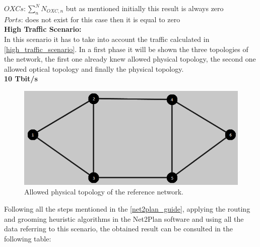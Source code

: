 \vspace{13pt}
$OXCs: \sum_n^N N_{OXC,n}$ but as mentioned initially this result is always zero \\

$Ports$: does not exist for this case then it is equal to zero \\

\textbf{High Traffic Scenario:}\\

In this scenario it has to take into account the traffic calculated in \ref{high_traffic_scenario}. In a first phase it will be shown the three topologies of the network, the first one already knew allowed physical topology, the second one allowed optical topology and finally the physical topology.\\

\textbf{10 Tbit/s}

\begin{figure}[H]
\centering
\includegraphics[width=13cm]{sdf/heuristic/figures/topological_design1}
\caption{Allowed physical topology of the reference network.}
\label{allowed_physical_surv_ref_low_heuristic}
\end{figure}

Following all the steps mentioned in the \ref{net2plan_guide}, applying the routing and grooming heuristic algorithms in the Net2Plan software and using all the data referring to this scenario, the obtained result can be consulted in the following table:

